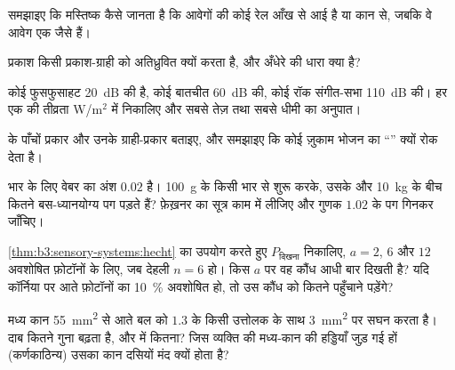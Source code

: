 \begin{exercise}[$\star$]\label{exo:b3:sensory-systems:1}
समझाइए कि मस्तिष्क कैसे जानता है कि आवेगों की कोई रेल आँख से आई है या
कान से, जबकि वे आवेग एक जैसे हैं।
\end{exercise}

\begin{exercise}[$\star$]\label{exo:b3:sensory-systems:2}
प्रकाश किसी प्रकाश-ग्राही को अतिध्रुवित क्यों करता है, और अँधेरे की
धारा क्या है?
\end{exercise}

\begin{exercise}[$\star$]\label{exo:b3:sensory-systems:3}
कोई फुसफुसाहट \qty{20}{dB} की है, कोई बातचीत \qty{60}{dB} की, कोई रॉक
संगीत-सभा \qty{110}{dB} की। हर एक की तीव्रता W/m$^{2}$ में निकालिए और
सबसे तेज़ तथा सबसे धीमी का अनुपात।
\end{exercise}

\begin{exercise}[$\star$]\label{exo:b3:sensory-systems:4}
 के पाँचों प्रकार और उनके ग्राही-प्रकार बताइए, और समझाइए कि कोई
ज़ुकाम भोजन का ``'' क्यों रोक देता है।
\end{exercise}

\begin{exercise}[$\star\star$]\label{exo:b3:sensory-systems:5}
भार के लिए वेबर का अंश $0.02$ है। \qty{100}{g} के किसी भार से शुरू
करके, उसके और \qty{10}{kg} के बीच कितने बस-ध्यानयोग्य पग पड़ते हैं?
फ़ेख़नर का सूत्र काम में लीजिए और गुणक $1.02$ के पग गिनकर जाँचिए।
\end{exercise}

\begin{exercise}[$\star\star$]\label{exo:b3:sensory-systems:6}
\cref{thm:b3:sensory-systems:hecht} का उपयोग करते हुए $P_{\text{दिखना}}$
निकालिए, $a = 2$, $6$ और $12$ अवशोषित फ़ोटॉनों के लिए, जब देहली
$n = 6$ हो। किस $a$ पर वह कौंध आधी बार दिखती है? यदि कॉर्निया पर आते
फ़ोटॉनों का \qty{10}{\%} अवशोषित हो, तो उस कौंध को कितने पहुँचाने पड़ेंगे?
\end{exercise}

\begin{exercise}[$\star\star$]\label{exo:b3:sensory-systems:7}
मध्य कान \qty{55}{mm^2} से आते बल को $1.3$ के किसी उत्तोलक के साथ
\qty{3}{mm^2} पर सघन करता है। दाब कितने गुना बढ़ता है, और  में
कितना? जिस व्यक्ति की मध्य-कान की हड्डियाँ जुड़ गई हों (कर्णकाठिन्य)
उसका कान दसियों  मंद क्यों होता है?
\end{exercise}

